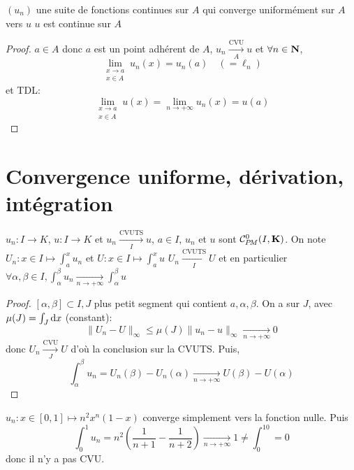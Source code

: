 \begin{cor}
    \Hyp $(u_n)$ une suite de fonctions continues sur  $A$ qui converge uniformément sur  $A$ vers  $u$
    \Conc  $u$ est continue sur  $A$
\end{cor}

\begin{proof}
    $a \in  A$ donc $a$ est un point adhérent de  $A$,  $u_n \xrightarrow[A]{\text{CVU}}u$ et $\forall  n \in  \mathbf N$, \[
        \lim_{\substack{x \to  a\\x \in  A}}u_n(x)=u_n(a) \quad (=\ell _n)
    \] 
    et TDL: \[
        \lim_{\substack{x \to  a\\x \in  A}}u(x)=\lim_{n \to  +\infty}u_n(x)=u(a)
    \] 
\end{proof}

\section{Convergence uniforme, dérivation, intégration}

\begin{thm}
    \Hyp $u_n:I\to K$, $u:I\to K$ et $u_n \xrightarrow[I]{\text{CVUTS}}u$, $a \in  I$, $u_n$ et  $u$ sont $\CPM(I, \K)$. On note $U_n:x \in  I \longmapsto \displaystyle\int_a^xu_n$ et $U:x \in  I \longmapsto \displaystyle \int_a^x u$
    \Conc $U_n \xrightarrow[I]{\text{CVUTS}} U$ et en particulier $ \forall \alpha, \beta \in  I, \displaystyle \int_{\alpha}^\beta u_n \xrightarrow[n\to+\infty]{}\int_\alpha^\beta u$
\end{thm}

\begin{proof}
    $[\alpha, \beta] \subset I, J$ plus petit segment qui contient  $a, \alpha, \beta$. On a sur $J$, avec $\mu(J)=\int_J\mathrm{d} x$ (constant): \[
        \|U_n-U\|_{\infty}\leq \mu(J) \|u_n-u\|_\infty \xrightarrow[n\to+\infty]{}0
    \] 
    donc $U_n \xrightarrow[J]{\text{CVU}}U$ d'où la conclusion sur la CVUTS. Puis, \[
        \int_\alpha^\beta u_n=U_n(\beta)-U_n(\alpha) \xrightarrow[n\to+\infty]{}U(\beta)-U(\alpha)
    \] 
\end{proof}

\begin{ex}
    $u_n:x \in  [0, 1] \longmapsto n^2x^n(1-x)$ converge simplement vers la fonction nulle. Puis \[
        \int_0^1 u_n = n^2 \left( \frac{1}{n+1}-\frac{1}{n+2} \right) \xrightarrow[n\to+\infty]{}1\neq \int_0^10=0
    \] 
    donc il n'y a pas CVU.
\end{ex}


